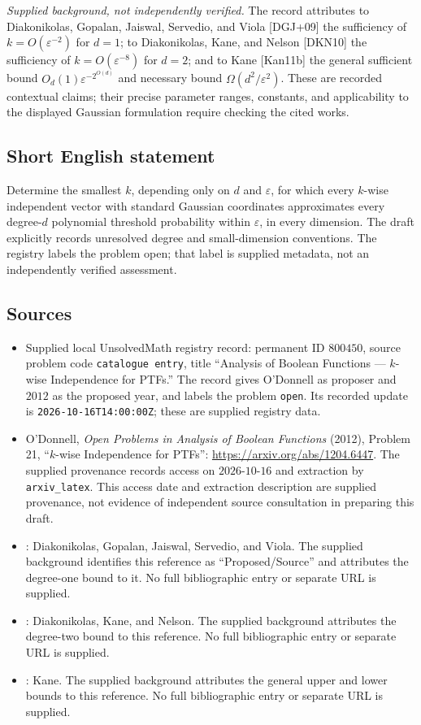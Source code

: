 \documentclass[11pt]{article}
\begin{document}
\emph{Supplied background, not independently verified.} The record attributes to Diakonikolas, Gopalan, Jaiswal, Servedio, and Viola [DGJ+09] the sufficiency of \(k=O(\varepsilon^{-2})\) for \(d=1\); to Diakonikolas, Kane, and Nelson [DKN10] the sufficiency of \(k=O(\varepsilon^{-8})\) for \(d=2\); and to Kane [Kan11b] the general sufficient bound \(O_d(1)\varepsilon^{-2^{O(d)}}\) and necessary bound \(\Omega(d^2/\varepsilon^2)\). These are recorded contextual claims; their precise parameter ranges, constants, and applicability to the displayed Gaussian formulation require checking the cited works.
\subsection{Short English statement}
Determine the smallest \(k\), depending only on \(d\) and \(\varepsilon\), for which every \(k\)-wise independent vector with standard Gaussian coordinates approximates every degree-\(d\) polynomial threshold probability within \(\varepsilon\), in every dimension. The draft explicitly records unresolved degree and small-dimension conventions. The registry labels the problem open; that label is supplied metadata, not an independently verified assessment.
\subsection{Sources}
\begin{itemize}
\item Supplied local UnsolvedMath registry record: permanent ID \(800450\), source problem code \texttt{catalogue entry}, title ``Analysis of Boolean Functions --- \(k\)-wise Independence for PTFs.'' The record gives O'Donnell as proposer and \(2012\) as the proposed year, and labels the problem \texttt{open}. Its recorded update is \texttt{2026-10-16T14:00:00Z}; these are supplied registry data.
\item O'Donnell, \emph{Open Problems in Analysis of Boolean Functions} (2012), Problem 21, ``\(k\)-wise Independence for PTFs'': \url{https://arxiv.org/abs/1204.6447}. The supplied provenance records access on \(2026\text{-}10\text{-}16\) and extraction by \texttt{arxiv\_latex}. This access date and extraction description are supplied provenance, not evidence of independent source consultation in preparing this draft.
\item [DGJ+09]: Diakonikolas, Gopalan, Jaiswal, Servedio, and Viola. The supplied background identifies this reference as ``Proposed/Source'' and attributes the degree-one bound to it. No full bibliographic entry or separate URL is supplied.
\item [DKN10]: Diakonikolas, Kane, and Nelson. The supplied background attributes the degree-two bound to this reference. No full bibliographic entry or separate URL is supplied.
\item [Kan11b]: Kane. The supplied background attributes the general upper and lower bounds to this reference. No full bibliographic entry or separate URL is supplied.
\end{itemize}
\end{document}
